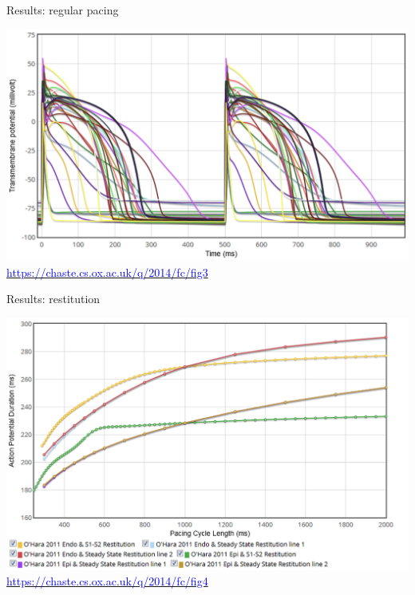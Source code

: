 \documentclass[t,xcolor={usenames,dvipsnames}]{beamer}
\newcommand{\myhref}[2]{\href{#1}{\textcolor{Blue}{#2}}}
\newcommand{\myurl}[1]{\myhref{#1}{#1}}
\begin{document}
\begin{frame}{Results: regular pacing}
\begin{center}
\includegraphics[width=\textwidth]{weblab_fig3}\\
\tiny\myurl{https://chaste.cs.ox.ac.uk/q/2014/fc/fig3}
\end{center}
\end{frame}


\begin{frame}{Results: restitution}
\begin{center}
\vspace{-.5cm}
\includegraphics[width=\textwidth]{weblab_fig4}\\
\tiny\myurl{https://chaste.cs.ox.ac.uk/q/2014/fc/fig4}
\end{center}
\end{frame}
\end{document}
